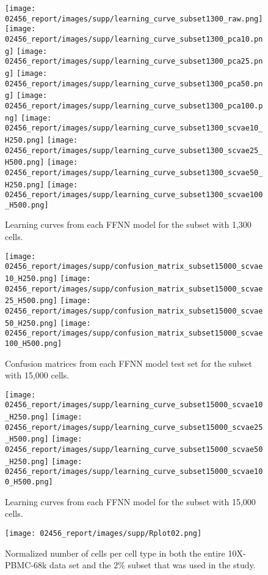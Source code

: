 \documentclass{article}
\begin{document}
\begin{figure}[h!]
    \centering
    \texttt{[image: 02456\_report/images/supp/learning\_curve\_subset1300\_raw.png]}
    \texttt{[image: 02456\_report/images/supp/learning\_curve\_subset1300\_pca10.png]}
    \texttt{[image: 02456\_report/images/supp/learning\_curve\_subset1300\_pca25.png]}
    \texttt{[image: 02456\_report/images/supp/learning\_curve\_subset1300\_pca50.png]}
    \texttt{[image: 02456\_report/images/supp/learning\_curve\_subset1300\_pca100.png]}
    \texttt{[image: 02456\_report/images/supp/learning\_curve\_subset1300\_scvae10\_H250.png]}
    \texttt{[image: 02456\_report/images/supp/learning\_curve\_subset1300\_scvae25\_H500.png]}
    \texttt{[image: 02456\_report/images/supp/learning\_curve\_subset1300\_scvae50\_H250.png]}
    \texttt{[image: 02456\_report/images/supp/learning\_curve\_subset1300\_scvae100\_H500.png]}
    \caption{Learning curves from each FFNN model for the subset with 1,300 cells.}
    \label{sfig:lc1300}
\end{figure}



\begin{figure}[h!]
    \centering
    \texttt{[image: 02456\_report/images/supp/confusion\_matrix\_subset15000\_scvae10\_H250.png]}
    \texttt{[image: 02456\_report/images/supp/confusion\_matrix\_subset15000\_scvae25\_H500.png]}
    \texttt{[image: 02456\_report/images/supp/confusion\_matrix\_subset15000\_scvae50\_H250.png]}
    \texttt{[image: 02456\_report/images/supp/confusion\_matrix\_subset15000\_scvae100\_H500.png]}
    \caption{Confusion matrices from each FFNN model test set for the subset with 15,000 cells. }
    \label{sfig:confusions15000}
\end{figure}


\begin{figure}[h!]
    \centering
     \texttt{[image: 02456\_report/images/supp/learning\_curve\_subset15000\_scvae10\_H250.png]}
    \texttt{[image: 02456\_report/images/supp/learning\_curve\_subset15000\_scvae25\_H500.png]}
    \texttt{[image: 02456\_report/images/supp/learning\_curve\_subset15000\_scvae50\_H250.png]}
    \texttt{[image: 02456\_report/images/supp/learning\_curve\_subset15000\_scvae100\_H500.png]}
    \caption{Learning curves from each FFNN model for the subset with 15,000 cells.}
    \label{sfig:lc15000}
\end{figure}






\begin{figure}[h!]
    \centering
    \texttt{[image: 02456\_report/images/supp/Rplot02.png]}
    \caption{Normalized number of cells per cell type in both the entire 10X-PBMC-68k data set and the 2\% subset that was used in the study.}
    \label{sfig:classes}
\end{figure} 
\end{document}
